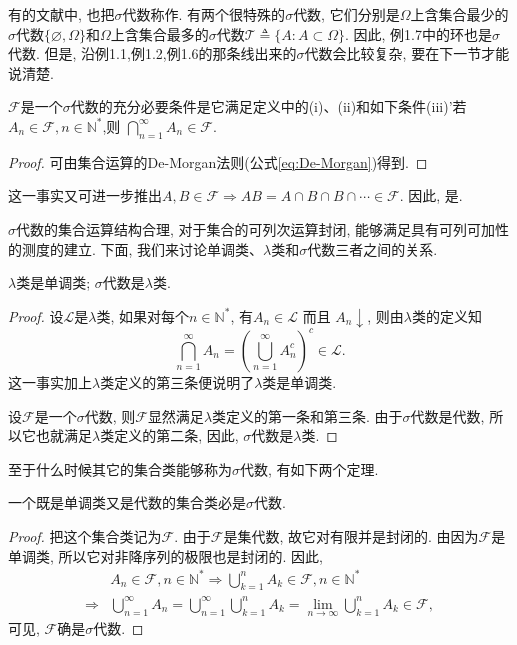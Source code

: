 有的文献中, 也把$\sigma$代数称作. 有两个很特殊的$\sigma$代数, 它们分别是$\Omega$上含集合最少的$\sigma$代数$\{\varnothing,\Omega \}$和$\Omega$上含集合最多的$\sigma$代数$\mathscr{T}\triangleq \{A:A\subset\Omega\}$. 因此, 例1.7中的环也是$\sigma$代数. 但是, 沿例1.1,例1.2,例1.6的那条线出来的$\sigma$代数会比较复杂, 要在下一节才能说清楚.

\begin{lemma}
	$\mathscr{F}$是一个$\sigma$代数的充分必要条件是它满足定义中的(i)、(ii)和如下条件(iii)'若$A_n\in\mathscr{F},n\in\mathbb{N}^*$,则 $ \bigcap\limits_{n=1}^{\infty}A_n\in\mathscr{F}.$
\end{lemma}
\begin{proof}
	可由集合运算的De-Morgan法则(公式\ref{eq:De-Morgan})得到.
\end{proof}

这一事实又可进一步推出$A,B\in\mathscr{F}\Rightarrow AB = A\cap B\cap B\cap\cdots\in\mathscr{F}.$
因此, 是.

$\sigma$代数的集合运算结构合理, 对于集合的可列次运算封闭, 能够满足具有可列可加性的测度的建立. 下面, 我们来讨论单调类、$\lambda$类和$\sigma$代数三者之间的关系.

\begin{lemma}
	$\lambda$类是单调类; $\sigma$代数是$\lambda$类.
\end{lemma}
\begin{proof}
	设$\mathscr{L}$是$\lambda$类, 如果对每个$n\in\mathbb{N}^*$, 有$A_n\in\mathscr{L}$ 而且 $A_n\downarrow$, 则由$\lambda$类的定义知
	\begin{equation}
	\bigcap_{n=1}^{\infty}A_n = \left( \bigcup_{n=1}^{\infty}A_n^c \right)^c\in\mathscr{L}.	
	\end{equation}
	这一事实加上$\lambda$类定义的第三条便说明了$\lambda$类是单调类.
	
	设$\mathscr{F}$是一个$\sigma$代数, 则$\mathscr{F}$显然满足$\lambda$类定义的第一条和第三条. 由于$\sigma$代数是代数, 所以它也就满足$\lambda$类定义的第二条, 因此, $\sigma$代数是$\lambda$类.
\end{proof}

至于什么时候其它的集合类能够称为$\sigma$代数, 有如下两个定理.
\begin{theorem}
	一个既是单调类又是代数的集合类必是$\sigma$代数.
\end{theorem}
\begin{proof}
	把这个集合类记为$\mathscr{F}$. 由于$\mathscr{F}$是集代数, 故它对有限并是封闭的. 由因为$\mathscr{F}$是单调类, 所以它对非降序列的极限也是封闭的. 因此, \begin{align}
	&A_n\in\mathscr{F},n\in\mathbb{N}^*\Rightarrow  \bigcup_{k=1}^nA_k\in\mathscr{F},n\in\mathbb{N}^*\nonumber\\
	\Rightarrow &\bigcup_{n=1}^{\infty}A_n = \bigcup_{n=1}^{\infty}\bigcup_{k=1}^nA_k = \lim_{n\to\infty}\bigcup_{k=1}^nA_k\in\mathscr{F},
	\end{align}
	可见, $\mathscr{F}$确是$\sigma$代数.
\end{proof}

